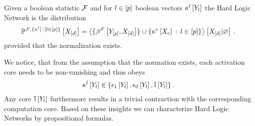 \begin{definition}
    \label{def:hardLogicNetwork}
    Given a boolean statistic $\mathcal{F}$ and for $l\in[p]$ boolean vectors $\kappa^{l}\left[Y_{l}\right]$ the Hard Logic Network is the distribution
    \begin{align*}
        \mathbb{P}^{\mathcal{F},\{\kappa^{l}\left[\,:\,\right]l\in[p]\}}\left[X_{[d]}\right] =
        \left\langle 
            \{\beta^{\mathcal{F}}\left[Y_{[p]},X_{[d]}\right]\} \cup
            \{\kappa^{e}\left[X_{e}\right]\,:\,l\in[p]\}
        \right\rangle \left[ X_{[d]} | \varnothing \right] \, .
    \end{align*}
    provided that the normalization exists.
\end{definition}

We notice, that from the assumption that the normation exists, each activation core needs to be non-vanishing and thus obeys
\begin{align*}
    \kappa^{l}\left[Y_{l}\right]\in\{\epsilon_1\left[Y_{l}\right],\epsilon_0\left[Y_{l}\right],\mathbb{I}\left[Y_{l}\right]\}    \, .
\end{align*}
Any core $\mathbb{I}\left[Y_{l}\right]$ furthermore results in a trivial contraction with the corresponding computation core.
Based on these insights we can characterize Hard Logic Networks by propositional formulas.

